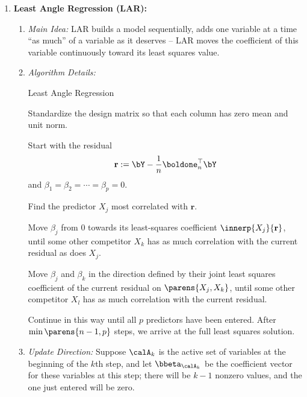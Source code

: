 \documentclass[12pt]{article}
\begin{document}
\begin{enumerate}[label=\textbf{\arabic*.}]
	\item \textbf{Least Angle Regression (LAR):} 
	\begin{enumerate}
		\item \textit{Main Idea:} LAR builds a model sequentially, adds one variable at a time ``as much'' of a variable as it deserves -- LAR moves the coefficient of this variable continuously toward its least squares value. 
		
		\item \textit{Algorithm Details:} 
		
		\begin{minipage}{\linewidth}
			\begin{algorithm}[H]
			\caption{Least Angle Regression}
			\label{algo-lar}
			\begin{algorithmic}[1]
				\STATE Standardize the design matrix so that each column has zero mean and unit norm. 
				
				\STATE Start with the residual 
				\begin{align*}
					\mathbf{r} := \bY - \frac{1}{n} \boldone_n^\top \bY
				\end{align*}
				and $\beta_1 = \beta_2 = \cdots = \beta_p = 0$. 
				
				\STATE Find the predictor $X_j$ most correlated with $\mathbf{r}$. 
				
				\STATE Move $\beta_j$ from 0 towards its least-squares coefficient $\innerp{X_j}{\mathbf{r}}$, until some other competitor $X_k$ has as much correlation with the current residual as does $X_j$. 
				
				\STATE \label{algo-lar-step4} Move $\beta_j$ and $\beta_k$ in the direction defined by their joint least squares coefficient of the current residual on $\parens{X_j, X_k}$, until some other competitor $X_l$ has as much correlation with the current residual. 
	
				\STATE Continue in this way until all $p$ predictors have been entered. After $\min \parens{n - 1, p}$ steps, we arrive at the full least squares solution. 
			\end{algorithmic}
		\end{algorithm}
		\end{minipage}
		
		\vspace{10pt}
		
		\item \textit{Update Direction:} Suppose $\calA_k$ is the active set of variables at the beginning of the $k$th step, and let $\bbeta_{\calA_k}$ be the coefficient vector for these variables at this step; there will be $k - 1$ nonzero values, and the one just entered will be zero. 
		

\end{enumerate}
\end{enumerate}
\end{document}
